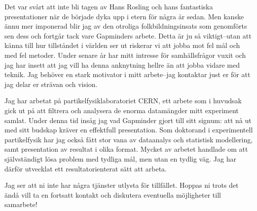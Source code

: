\documentclass[11pt, a4paper]{../awesome-cv} %
\begin{document}
\makecvheader %

\makelettertitle %


\begin{cvletter}



Det var svårt att inte bli tagen av Hans Rosling och hans fantastiska presentationer när de började dyka upp i etern för några år sedan.  
Men kanske ännu mer imponerad blir jag av den otroliga folkbildningsinsats som genomförts sen dess och fortgår tack vare Gapminders arbete.
Detta är ju så viktigt–utan att känna till hur tillståndet i världen ser ut riskerar vi att jobba mot fel mål och med fel metoder. %
Under senare år har mitt intresse för samhällsfrågor vuxit och jag har insett att jag vill ha denna anknytning hellre än att jobba vidare med teknik.
Jag behöver en stark motivator i mitt arbete–jag kontaktar just er för att jag delar er strävan och vision.

Jag har arbetat på partikelfysiklaboratoriet CERN, ett arbete som i huvudsak gick ut på att filtrera och analysera de enorma datamängder mitt experiment samlat.
Under denna tid insåg jag vad Gapminder gjort till sitt signum: att nå ut med sitt budskap kräver en effektfull presentation. 
Som doktorand i experimentell partikelfysik har jag också fått stor vana av dataanalys och statistisk modellering, samt presentation av resultat i olika format.
Mycket av arbetet handlade om att självständigt lösa problem med tydliga mål, men utan en tydlig väg.
Jag har därför utvecklat ett resultatorienterat sätt att arbeta.

Jag ser att ni inte har några tjänster utlysta för tillfället.
Hoppas ni trots det ändå vill ta en fortsatt kontakt och diskutera eventuella möjligheter till samarbete!


\end{cvletter}


\makeletterclosing %
\end{document}
